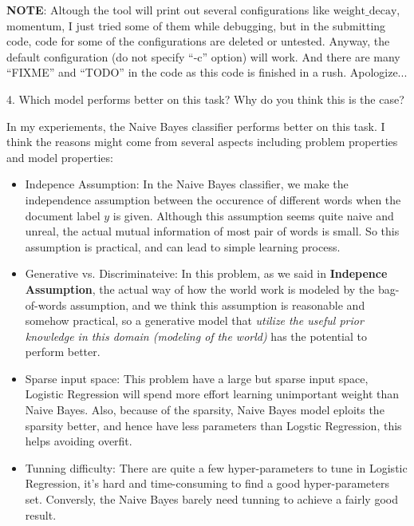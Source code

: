\documentclass{article}
\theoremstyle{definition}
\theoremstyle{definition}
\theoremstyle{remark}
\begin{document}
\begin{addmargin}[3em]{2em}
  \textbf{NOTE}: Altough the tool will print out several configurations like $\mbox{weight\_decay}$, $\mbox{momentum}$, I just tried some of them while debugging, but in the submitting code, code for some of the configurations are deleted or untested. Anyway, the default configuration (do not specify ``-c'' option) will work. And there are many ``FIXME'' and ``TODO'' in the code as this code is finished in a rush. Apologize... \\


\end{addmargin}

4. Which model performs better on this task? Why do you think this is the case?

\begin{addmargin}[3em]{2em}
  In my experiements, the Naive Bayes classifier performs better on this task. I think the reasons might come from several aspects including problem properties and model properties:
  \begin{itemize}
  \item Indepence Assumption: In the Naive Bayes classifier, we make the independence assumption between the occurence of different words when the document label $y$ is given. Although this assumption seems quite naive and unreal, the actual mutual information of most pair of words is small. So this assumption is practical, and can lead to simple learning process.
  \item Generative vs. Discriminateive: In this problem, as we said in \textbf{Indepence Assumption}, the actual way of how the world work is modeled by the bag-of-words assumption, and we think this assumption is reasonable and somehow practical, so a generative model that \textit{utilize the useful prior knowledge in this domain (modeling of the world)} has the potential to perform better.
  \item Sparse input space: This problem have a large but sparse input space, Logistic Regression will spend more effort learning unimportant weight than Naive Bayes. Also, because of the sparsity, Naive Bayes model eploits the sparsity better, and hence have less parameters than Logstic Regression, this helps avoiding overfit.
  \item Tunning difficulty: There are quite a few hyper-parameters to tune in Logistic Regression, it's hard and time-consuming to find a good hyper-parameters set. Conversly, the Naive Bayes barely need tunning to achieve a fairly good result.
  \end{itemize}
\end{addmargin}




\end{document}
